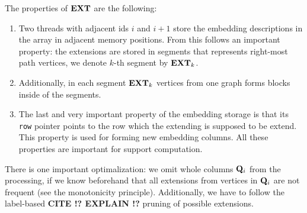 The properties of $\mathbf{EXT}$ are the following:

\begin{enumerate}
\item Two threads with adjacent ids $i$ and $i+1$ store the embedding
  descriptions in the array in adjacent memory positions. From this
  follows an important property: the extensions are stored in segments
  that represents right-most path vertices, we denote $k$-th segment
  by $\mathbf{EXT}_k$.
\item Additionally, in each segment $\mathbf{EXT}_k$ vertices from
  one graph forms blocks inside of the segments. 
\item The last and very important property of the embedding storage is
  that its \texttt{row} pointer points to the row which the extending
  is supposed to be extend. This property is used for forming new
  embedding columns. All these properties are important for support
  computation.
\end{enumerate}

There is one important optimalization: we omit whole columns
$\mathbf{Q}_i$ from the processing, if we know beforehand that all
extensions from vertices in $\mathbf{Q}_i$ are not frequent (see the
monotonicity principle). Additionally, we have to follow the
label-based \textbf{CITE !? EXPLAIN !?} pruning of possible
extensions.






